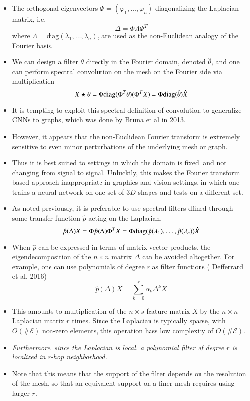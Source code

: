 \documentclass[12pt]{article}
\numberwithin{equation}{section}
\theoremstyle{definition}
\newcommand{		\1		}	{	\bm{1}					}%
\newcommand{		\diag		}	{	{\rm{diag}}					}
\begin{document}
\begin{itemize}
\item The orthogonal eigenvectors $\Phi = (\varphi_1, \dots, \varphi_n)$ diagonalizing the Laplacian matrix, i.e. 
$$
\Delta = \Phi \Lambda \Phi^T 
$$ 
where $\Lambda = \textrm{diag}(\lambda_1, \dots, \lambda_n)$, are used as the non-Euclidean analogy of the Fourier basis.
\item We can design a filter $\theta$ directly in the Fourier domain, denoted $\hat{\theta}$, and one can perform spectral convolution on the mesh on the Fourier side via multiplication
$$
X \star \theta = \Phi \diag( \Phi^T \theta) (\Phi^T X) = \Phi \diag(\hat{\theta}) \hat{X} 
$$
\item It is tempting to exploit this spectral definition of convolution to generalize CNNs to graphs, which was done by Bruna et al in 2013. 
\item However, it appears that the non-Euclidean Fourier transform is extremely sensitive to even minor perturbations of the underlying mesh or graph.
\item Thus it is best suited to settings in which the domain is fixed, and not changing from signal to signal. Unluckily, this makes the Fourier transform based approach inappropriate in graphics and vision settings, in which one trains a neural network on one set of $3D$ shapes and tests on a different set.
\item As noted previously, it is preferable to use spectral filters dfined through some transfer function $\hat{p}$ acting on the Laplacian. 
$$
\hat{p} (\Delta) X = \Phi \hat{p}(\Lambda) \Phi^T X = \Phi \diag(\hat{p}(\lambda_1), \dots, \hat{p}(\lambda_n) ) \hat{X} 
$$
\item When $\hat{p}$ can be expressed in terms of matrix-vector products, the eigendecomposition of the $n \times n$ matrix $\Delta$ can be avoided altogether. For example, one can use polynomials of degree $r$ as filter functions ( Defferrard et al. 2016)
$$
\hat{p}(\Delta) X = \sum_{k=0}^r \alpha_k \Delta^k X
$$
\item This amounts to multiplication of the $n \times s$ feature matrix $X$ by the $n \times n$ Laplacian matrix $r$ times. Since the Laplacian is typically sparse, with $O(\# \mathcal{E})$ non-zero elements, this operation hass low complexity of $O (\# \mathcal{E})$.
\item \emph{Furthermore, since the Laplacian is local, a polynomial filter of degree $r$ is localized in $r$-hop neighborhood. }
\item Note that this means that the support of the filter depends on the resolution of the mesh, so that an equivalent support on a finer mesh requires using larger $r$. 

\end{itemize}
\end{document}
